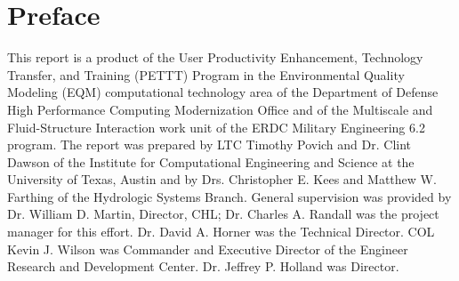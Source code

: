 \documentclass[letterpaper]{erdc}
\begin{document}




\maketitle
\setcounter{tocdepth}{1}
\tableofcontents

\listoffiguresandtables
%
\chapter{Preface}

This report is a product of the User Productivity Enhancement,
Technology Transfer, and Training (PETTT) Program in the Environmental
Quality Modeling (EQM) computational technology area of the Department
of Defense High Performance Computing Modernization Office and of the
Multiscale and Fluid-Structure Interaction work unit of the ERDC
Military Engineering 6.2 program. The report was prepared by LTC
Timothy Povich and Dr. Clint Dawson of the Institute for Computational
Engineering and Science at the University of Texas, Austin and by
Drs. Christopher E. Kees and Matthew W. Farthing of the Hydrologic
Systems Branch.  General supervision was provided by Dr. William
D. Martin, Director, CHL; Dr. Charles A. Randall was the project
manager for this eﬀort. Dr. David A. Horner was the Technical
Director. COL Kevin J. Wilson was Commander and Executive Director of
the Engineer Research and Development Center. Dr. Jeffrey P. Holland
was Director.

\mainmatter




\appendix
%
%
\end{document}
